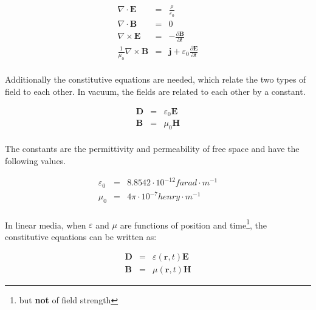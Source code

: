 \documentclass[a4paper,10pt]{thesis}
\begin{document}
\begin{eqnarray}
\nabla \cdot \mathbf{E}&=& \frac{\rho}{\varepsilon_0} \label{maxwell_freespace1}\\
\nabla \cdot \mathbf{B}&=& 0 \label{maxwell_freespace2}\\
\nabla \times \mathbf{E}&=& -\frac{\partial \mathbf{B}}{\partial t} \label{maxwell_freespace3}\\
\frac{1}{\mu_0}\nabla \times \mathbf{B}&=&\mathbf{j}+\varepsilon_0 \frac{\partial \mathbf{E}}{\partial t} \label{maxwell_freespace4}
\end{eqnarray}

\paragraph*{}
Additionally the constitutive equations are needed, which relate the two types of field to each other. In vacuum, the fields are related to each other by a constant.

\begin{eqnarray}
\mathbf{D} &=& \varepsilon_0 \mathbf{E} \label{constitutive_1_vacuum} \\
\mathbf{B} &=& \mu_0 \mathbf{H} \label{constitutive_2_vacuum}
\end{eqnarray}

\paragraph*{}
The constants are the permittivity and permeability of free space and have the following values.

\begin{eqnarray}
  \varepsilon_0 &=& 8.8542 \cdot 10^{-12} farad \cdot m^{-1} \\
\mu_0 &=& 4 \pi \cdot 10^{-7} henry \cdot m^{-1}
\end{eqnarray}

\paragraph*{}
In linear media, when $\varepsilon$ and $\mu$ are functions of position and time\footnote{but \textbf{not} of field strength}, the constitutive equations can be written as:

\begin{eqnarray}
\mathbf{D} &=& \varepsilon (\mathbf{r},t) \mathbf{E} \label{constitutive_1_linear} \\
\mathbf{B} &=& \mu (\mathbf{r},t) \mathbf{H} \label{constitutive_2_linear}
\end{eqnarray}
\end{document}
